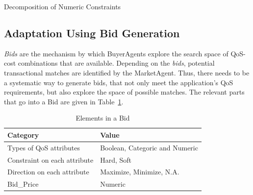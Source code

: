 \documentclass[10pt,journal,compsoc]{IEEEtran}
\begin{document}
\begin{algorithm}
 \DontPrintSemicolon
 \caption{Decomposition of Numeric Constraints \label{algo_decomposing_numeric_constraints}}
\end{algorithm}

\subsection{Adaptation Using Bid Generation}\label{bid_generation}

\textit{Bids} are the mechanism by which BuyerAgents explore the search space of QoS-cost combinations that are available. Depending on the \textit{bids}, potential transactional matches are identified by the MarketAgent. Thus, there needs to be a systematic way to generate bids, that not only meet the application's QoS requirements, but also explore the space of possible matches. The relevant parts that go into a Bid are given in Table~\ref{tbl:bid_elements}.

\begin{table}
\centering
\begin{tabular}{p{7cm}p{7cm}}
\toprule
Category & Value \\
\midrule
Types of QoS attributes & Boolean, Categoric  and Numeric \\
Constraint on each attribute & Hard, Soft \\ 
Direction on each attribute & Maximize, Minimize, N.A. \\ 
Bid\_Price & Numeric \\
\bottomrule
\end{tabular}
\caption{Elements in a Bid \label{tbl:bid_elements}}
\end{table}
\end{document}

